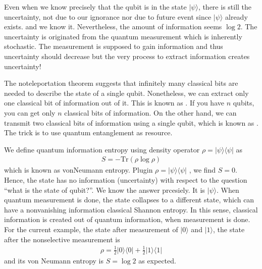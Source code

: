 \documentclass[letterpaper,10pt,english]{jupyterBook}
\begin{document}
\sphinxAtStartPar
Even when we know precisely that the qubit is in the state \(\lvert \psi \rangle\), there is still the uncertainty, not due to our ignorance nor due to future event since \(\lvert \psi \rangle\) already exists. and we know it.  Nevertheless, the amount of information seems \(\log 2\). The uncertainty is originated from the quantum measurement which is inherently stochastic.  The measurement is supposed to gain information and thus uncertainty should decrease but the very process to extract information creates uncertainty!

\sphinxAtStartPar
The no\sphinxhyphen{}teleportation theorem suggests that infinitely many classical bits are needed to describe the state of a single qubit.  Nonetheless, we can extract only one classical bit of information out of it.  This is known as .  If you have \(n\) qubits, you can get only \(n\) classical bits of information.  On the other hand, we can transmit two classical bits of information using a single qubit, which is known as .  The trick is to use quantum entanglement as resource.

\sphinxAtStartPar
We define quantum information entropy using density operator \(\rho = \lvert \psi \rangle \langle \psi \rvert\) as
\begin{equation*}
\begin{split}
S = - \text{Tr} \left(\rho \log \rho\right)
\end{split}
\end{equation*}
\sphinxAtStartPar
which is known as von\sphinxhyphen{}Neumann entropy. Plugin \(\rho = \lvert \psi \rangle \langle \psi \rvert\) , we find \(S=0\).  Hence, the state has no information (uncertainty) with respect to the question “what is the state of qubit?”.  We know the answer prcesiely. It is \(|\psi\rangle\). When quantum measurement is done, the state collapses to a different state, which can have a non\sphinxhyphen{}vanishing information classical Shannon entropy.  In this sense, classical information is created out of quantum information, when measurement is done.  For the current example, the state after measurement of \(\lvert 0 \rangle\) and \(\lvert 1 \rangle\), the state after the non\sphinxhyphen{}selective measurement is
\begin{equation*}
\begin{split}
\rho = \frac{1}{2}  \lvert 0 \rangle \langle 0 \rvert + \frac{1}{2}  \lvert 1 \rangle \langle 1 \rvert
\end{split}
\end{equation*}
\sphinxAtStartPar
and its von Neumann entropy is \(S = \log 2\) as expected.
\end{document}
